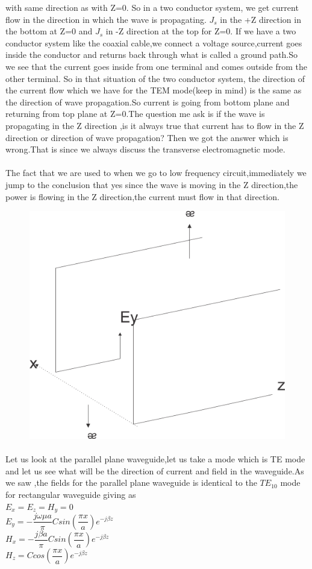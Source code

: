with same direction as with Z=0. So in a two conductor system, we get current flow in the direction in which the wave is propagating. ${J_s}$ in the +Z direction in the bottom at Z=0 and ${J_s}$ in -Z direction at the top for Z=0. If we have a two conductor system like the coaxial cable,we connect a voltage source,current goes inside the conductor and returns back through what is called a ground path.So we see that the current goes inside from one terminal and comes outside from the other terminal. So in that situation of the two conductor system, the direction of the current flow which we have for the TEM mode(keep in mind) is the same as the direction of wave propagation.So current is going from bottom plane and returning from top plane at Z=0.The question me ask is if the wave is propagating in the Z direction ,is it always true that current has to flow in the Z direction or direction of wave propagation? Then we got the answer which is wrong.That is since we always discuss the transverse electromagnetic mode.
\paragraph{}The fact that we are used to when we go to low frequency circuit,immediately we jump to the conclusion that yes since the wave is moving in the Z direction,the power is flowing in the Z direction,the current must flow in that direction.
\begin{figure}[h]
\centering
\includegraphics[width=.7\linewidth]{./graphics/WATSON4}
\caption{}
\end{figure}
\paragraph{}Let us look at the parallel plane waveguide,let us take a mode which is TE mode and let us see what will be the direction of current and field in the waveguide.As we saw ,the fields for the parallel plane waveguide is identical to the $TE_{10}$ mode for rectangular waveguide giving as\\
${E_x = E_z = H_y = 0}$\\
$E_y = -\dfrac{j\omega \mu a}{\pi}Csin(\dfrac{\pi x}{a})e^{-j\beta z}$\\
$H_x = -\dfrac{j\beta a}{\pi}Csin(\dfrac{\pi x}{a})e^{-j\beta z}$\\
$H_z = Ccos(\dfrac{\pi x}{a})e^{-j\beta z}$

